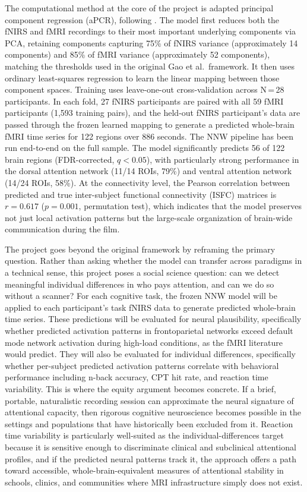 The computational method at the core of the project is adapted principal component regression (aPCR), following \citet{gao2025}. The model first reduces both the fNIRS and fMRI recordings to their most important underlying components via PCA, retaining components capturing 75\% of fNIRS variance (approximately 14 components) and 85\% of fMRI variance (approximately 52 components), matching the thresholds used in the original Gao et al.\ framework. It then uses ordinary least-squares regression to learn the linear mapping between those component spaces. Training uses leave-one-out cross-validation across N\,=\,28 participants. In each fold, 27 fNIRS participants are paired with all 59 fMRI participants (1,593 training pairs), and the held-out fNIRS participant's data are passed through the frozen learned mapping to generate a predicted whole-brain fMRI time series for 122 regions over 886 seconds. The NNW pipeline has been run end-to-end on the full sample. The model significantly predicts 56 of 122 brain regions (FDR-corrected, $q < 0.05$), with particularly strong performance in the dorsal attention network (11/14 ROIs, 79\%) and ventral attention network (14/24 ROIs, 58\%). At the connectivity level, the Pearson correlation between predicted and true inter-subject functional connectivity (ISFC) matrices is $r = 0.617$ ($p = 0.001$, permutation test), which indicates that the model preserves not just local activation patterns but the large-scale organization of brain-wide communication during the film.

The project goes beyond the original \citet{gao2025} framework by reframing the primary question. Rather than asking whether the model can transfer across paradigms in a technical sense, this project poses a social science question: can we detect meaningful individual differences in who pays attention, and can we do so without a scanner? For each cognitive task, the frozen NNW model will be applied to each participant's task fNIRS data to generate predicted whole-brain time series. These predictions will be evaluated for neural plausibility, specifically whether predicted activation patterns in frontoparietal networks exceed default mode network activation during high-load conditions, as the fMRI literature would predict. They will also be evaluated for individual differences, specifically whether per-subject predicted activation patterns correlate with behavioral performance including n-back accuracy, CPT hit rate, and reaction time variability. This is where the equity argument becomes concrete. If a brief, portable, naturalistic recording session can approximate the neural signature of attentional capacity, then rigorous cognitive neuroscience becomes possible in the settings and populations that have historically been excluded from it. Reaction time variability is particularly well-suited as the individual-differences target because it is sensitive enough to discriminate clinical and subclinical attentional profiles, and if the predicted neural patterns track it, the approach offers a path toward accessible, whole-brain-equivalent measures of attentional stability in schools, clinics, and communities where MRI infrastructure simply does not exist.

